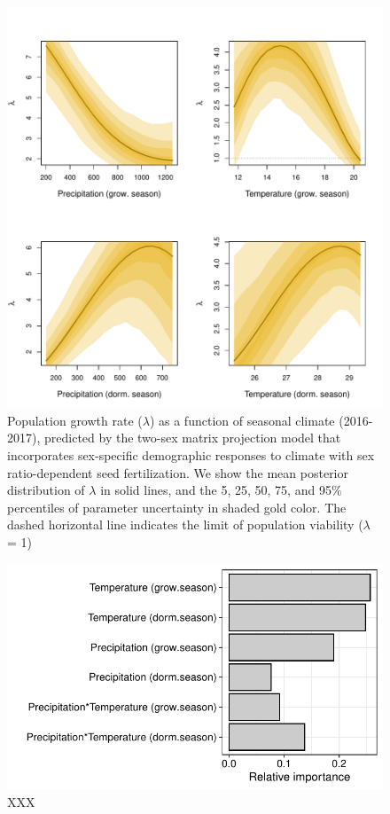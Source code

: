 \documentclass[12pt]{article}
\begin{document}
	\begin{figure}[h!]
  \begin{center}
    \includegraphics[width=0.95\linewidth]{Figures/lambda_CI.pdf}
  \caption{Population growth rate ($\lambda$) as a function of seasonal climate (2016-2017), predicted by the two-sex matrix projection model that incorporates sex-specific demographic responses to climate with sex ratio-dependent seed fertilization.
We show the mean posterior distribution of $\lambda$ in solid lines, and the 5, 25, 50, 75, and 95\% percentiles of parameter uncertainty in shaded gold color.
The dashed horizontal line indicates the limit of population viability ($\lambda$ = 1)}
  \label{Sup:lambda2sex}
  \end{center}
\end{figure}

\begin{figure}[h!]
  \begin{center}
    \includegraphics[width=0.55\linewidth]{Figures/Fig_LTRE.pdf}
  \caption{XXX}
  \label{Sup:LTRE}
  \end{center}
\end{figure}
\end{document}
